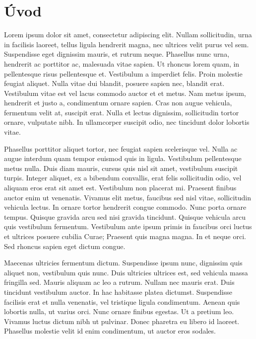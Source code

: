 \chapter*{Úvod}

Lorem ipsum dolor sit amet, consectetur adipiscing elit. Nullam sollicitudin, urna in facilisis laoreet, tellus ligula hendrerit magna, nec ultrices velit purus vel sem. Suspendisse eget dignissim mauris, et rutrum neque. Phasellus nunc urna, hendrerit ac porttitor ac, malesuada vitae sapien. Ut rhoncus lorem quam, in pellentesque risus pellentesque et. Vestibulum a imperdiet felis. Proin molestie feugiat aliquet. Nulla vitae dui blandit, posuere sapien nec, blandit erat. Vestibulum vitae est vel lacus commodo auctor et et metus. Nam metus ipsum, hendrerit et justo a, condimentum ornare sapien. Cras non augue vehicula, fermentum velit at, suscipit erat. Nulla et lectus dignissim, sollicitudin tortor ornare, vulputate nibh. In ullamcorper suscipit odio, nec tincidunt dolor lobortis vitae.

Phasellus porttitor aliquet tortor, nec feugiat sapien scelerisque vel. Nulla ac augue interdum quam tempor euismod quis in ligula. Vestibulum pellentesque metus nulla. Duis diam mauris, cursus quis nisl sit amet, vestibulum suscipit turpis. Integer aliquet, ex a bibendum convallis, erat felis sollicitudin odio, vel aliquam eros erat sit amet est. Vestibulum non placerat mi. Praesent finibus auctor enim ut venenatis. Vivamus elit metus, faucibus sed nisl vitae, sollicitudin vehicula lectus. In ornare tortor hendrerit congue commodo. Nunc porta ornare tempus. Quisque gravida arcu sed nisi gravida tincidunt. Quisque vehicula arcu quis vestibulum fermentum. Vestibulum ante ipsum primis in faucibus orci luctus et ultrices posuere cubilia Curae; Praesent quis magna magna. In et neque orci. Sed rhoncus sapien eget dictum congue.

Maecenas ultricies fermentum dictum. Suspendisse ipsum nunc, dignissim quis aliquet non, vestibulum quis nunc. Duis ultricies ultrices est, sed vehicula massa fringilla sed. Mauris aliquam ac leo a rutrum. Nullam nec mauris erat. Duis tincidunt vestibulum auctor. In hac habitasse platea dictumst. Suspendisse facilisis erat et nulla venenatis, vel tristique ligula condimentum. Aenean quis lobortis nulla, ut varius orci. Nunc ornare finibus egestas. Ut a pretium leo. Vivamus luctus dictum nibh ut pulvinar. Donec pharetra eu libero id laoreet. Phasellus molestie velit id enim condimentum, ut auctor eros sodales.

